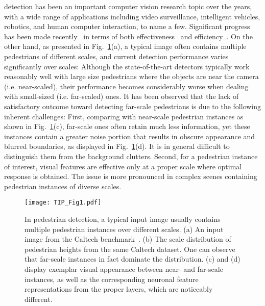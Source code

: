 \documentclass[10pt,journal,compsoc,twoside]{IEEEtran}
\begin{document}
\maketitle
\IEEEdisplaynontitleabstractindextext



 detection has been an important computer vision research topic over the years, with a wide range of applications including video surveillance, intelligent vehicles, robotics, and human computer interaction, to name a few. Significant progress has been made recently~\cite{ShaEtAl:cvpr16,TiaEtAl:cvpr15,YanEtAl:iccv15,SerEtAl:cvpr13,LiEtAl:cvpr15,RedEtAl:cvpr16} in terms of both effectiveness~\cite{ParEtAl:cvpr13,PaiSheHen:iccv13,PaiSheHen:eccv14,GirEtAl:cvpr14,ZhaBenSch:cvpr15,CaoPanLi:tip16} and efficiency~\cite{DolEtAl:bmvc10,WalEtAl:cvpr10,DolAppKie:eccv12,CheEtAl:cvpr13,OuyWan:iccv13,OuyZenWan:cvpr13}. On the other hand, as presented in Fig.~\ref{fig_1}(a), a typical image often contains multiple pedestrians of different scales, and current detection performance varies significantly over scales: Although the state-of-the-art detectors typically work reasonably well with large size pedestrians where the objects are near the camera (i.e. near-scaled),
their performance becomes considerably worse when dealing with small-sized (i.e. far-scaled) ones. It has been observed that the lack of satisfactory outcome toward detecting far-scale pedestrians is due to the following inherent challenges:
First, comparing with near-scale pedestrian instances as shown in Fig.~\ref{fig_1}(c), far-scale ones often retain much less information, yet these instances contain a greater noise portion that results in obscure appearance and blurred boundaries, as displayed in Fig.~\ref{fig_1}(d). It is in general difficult to distinguish them from the background clutters. Second, for a pedestrian instance of interest, visual features are effective only at a proper scale where optimal response is obtained. The issue is more pronounced in complex scenes containing pedestrian instances of diverse scales.



\begin{figure}[!t]
\centering
\texttt{[image: TIP\_Fig1.pdf]}
\caption{In pedestrian detection, a typical input image usually contains multiple pedestrian instances over different scales. (a) An input image from the Caltech benchmark~\cite{DolEtAl:cvpr09}. (b) The scale distribution of pedestrian heights from the same Caltech dataset. One can observe that far-scale instances in fact dominate the distribution. (c) and (d) display exemplar visual appearance between near- and far-scale instances, as well as the corresponding neuronal feature representations from the proper layers, which are noticeably different.}
\label{fig_1}
\end{figure}
\end{document}
